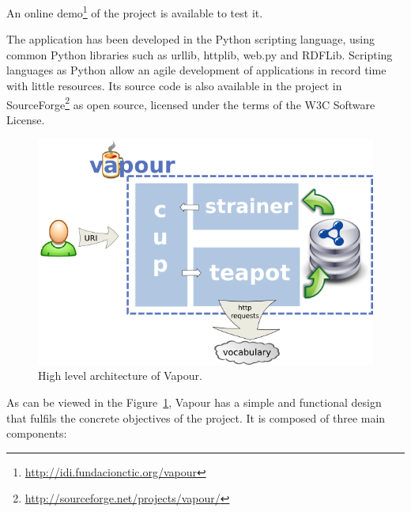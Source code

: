 \documentclass{../templates/llncs}
\begin{document}
An online demo\footnote{\url{http://idi.fundacionctic.org/vapour}} of the project
is available to test it.

The application has been developed in the Python scripting language, using common
Python libraries such as urllib, httplib, web.py and RDFLib. Scripting languages as
Python allow an agile development of applications in record time with little resources. 
Its source code is also available in the project in SourceForge\footnote{\url{http://sourceforge.net/projects/vapour/}} 
as open source, licensed under the terms of the W3C Software License.

\begin{figure}
 \centering
 \includegraphics[width=12cm]{images/arch.png}
 \caption{\label{fig:arch}High level architecture of Vapour.}
\end{figure}

As can be viewed in the Figure~\ref{fig:arch}, Vapour has a simple and functional
design that fulfils the concrete objectives of the project. It is composed of three
main components:
\end{document}
